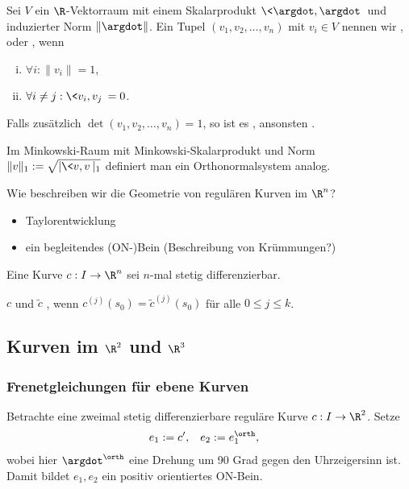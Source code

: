 \begin{df}
	Sei $V$ ein $\R$-Vektorraum mit einem Skalarprodukt $\<\argdot, \argdot\>$ und induzierter Norm $\|\argdot\|$.
	Ein Tupel $(v_1, v_2, \dotsc, v_n)$ mit $v_i \in V$ nennen wir , oder , wenn
	\begin{enumerate}[i)]
		\item
			$\forall i : \|v_i\| = 1$,
		\item
			$\forall i \neq j : \<v_i, v_j\> = 0$.
	\end{enumerate}
	Falls zusätzlich $\det(v_1, v_2, \dotsc, v_n) = 1$, so ist es , ansonsten .
	\begin{note}
		Im Minkowski-Raum mit Minkowski-Skalarprodukt und Norm $\|v\|_1 := \sqrt{|\<v,v\>|_1}$ definiert man ein Orthonormalsystem analog.
	\end{note}
\end{df}

Wie beschreiben wir die Geometrie von regulären Kurven im $\R^n$?
\begin{itemize}
	\item
		Taylorentwicklung
	\item
		ein begleitendes (ON-)Bein (Beschreibung von Krümmungen?)
\end{itemize}

Eine Kurve $c: I \to \R^n$ sei $n$-mal stetig differenzierbar.

\begin{df}
	$c$ und $\tilde c$ , wenn $c^{(j)}(s_0) = \tilde c^{(j)}(s_0)$ für alle $0 \le j \le k$.
\end{df}

\subsection{Kurven im \texorpdfstring{$\R^2$}{ℝ²} und \texorpdfstring{$\R^3$}{ℝ³}}

\subsubsection{Frenetgleichungen für ebene Kurven}

Betrachte eine zweimal stetig differenzierbare reguläre Kurve $c: I \to \R^2$.
Setze
\begin{align*}
	e_1 &:= c', &
	e_2 &:= e_1^\orth,
\end{align*}
wobei hier $\argdot^\orth$ eine Drehung um 90 Grad gegen den Uhrzeigersinn ist.
Damit bildet $e_1, e_2$ ein positiv orientiertes ON-Bein.

